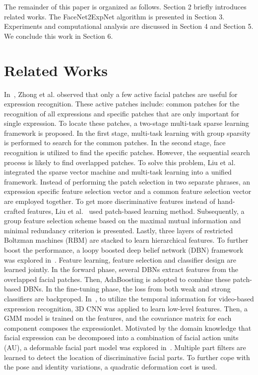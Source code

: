 \documentclass[a4paper, 10pt, conference]{ieeeconf}      %
\begin{document}
The remainder of this paper is organized as follows. Section 2 briefly introduces related works. The FaceNet2ExpNet algorithm is presented in Section 3. Experiments and computational analysis are discussed in Section 4 and Section 5. We conclude this work in Section 6.







\section{Related Works}
In~\cite{zhong2012learning}, Zhong et al. observed that only a few active facial patches are useful for expression recognition. These active patches include: common patches for the recognition of all expressions and specific patches that are only important for single expression. To locate these patches, a two-stage multi-task sparse learning framework is proposed. In the first stage, multi-task learning with group sparsity is performed to search for the common patches. In the second stage, face recognition is utilized to find the specific patches. However, the sequential search process is likely to find overlapped patches. To solve this problem, Liu et al.~\cite{liu2014feature} integrated the sparse vector machine and multi-task learning into a unified framework. Instead of performing the patch selection in two separate phrases, an expression specific feature selection vector and a common feature selection vector are employed together. 
To get more discriminative features instead of hand-crafted features, Liu et al.~\cite{liu2013aware} used patch-based learning method. Subsequently, a group feature selection scheme based on the maximal mutual information and minimal redundancy criterion is presented. 
Lastly, three layers of restricted Boltzman machines (RBM) are stacked to learn hierarchical features.
To further boost the performance, a loopy boosted deep belief network (DBN) framework was explored in~\cite{liu2014facial}. Feature learning, feature selection and classifier design are learned jointly. In the forward phase, several DBNs extract features from the overlapped facial patches. Then, AdaBoosting is adopted to combine these patch-based DBNs. In the fine-tuning phase, the loss from both weak and strong classifiers are backproped. 
In~\cite{liu2014learning}, to utilize the temporal information for video-based expression recognition, 3D CNN was applied to learn low-level features. Then, a GMM model is trained on the features, and the covariance matrix for each component composes the expressionlet. 
Motivated by the domain knowledge that facial expression can be decomposed into a combination of facial action units (AU), a deformable facial part model was explored in~\cite{liu2014deeply}. 
Multiple part filters are learned to detect the location of discriminative facial parts. To further cope with the pose and identity variations, a quadratic deformation cost is used.
\end{document}

